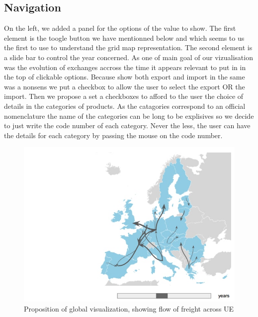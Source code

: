\documentclass{vgtc}
\begin{document}
\subsection{Navigation}
On the left, we added a panel for the options of the value to show. The first element is the toogle button we have mentionned below and which seems to us the first to use to  understand the grid map representation. The second element is a slide bar to control the year concerned. As one of main goal of our vizualisation was the evolution of exchanges accross the time it appears relevant to put in in the top of clickable options. Because show both export and import in the same was a nonsens we put a checkbox to allow the user to select the export OR the import. Then we propose a set a checkboxes to afford to the user the choice of details in the categories of products. As the catagories correspond to an official nomenclature the name of the categories can be long to be explisives so we decide to just write the code number of each category. Never the less, the user can have the details for each category by passing the mouse on the code number.


\begin{figure}[H]
\includegraphics[scale=0.35]{Capture_ecran_2017-11-29_171310.jpg}
\caption{Proposition of global visualization, showing flow of freight across UE}
\end{figure}
\end{document}
